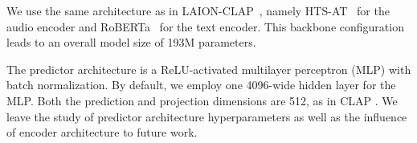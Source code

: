 \documentclass{article}
\begin{document}
We use the same architecture as in LAION-CLAP~\cite{wu2023large}, namely HTS-AT~\cite{chen2022hts} for the audio encoder and RoBERTa~\cite{liu2019roberta} for the text encoder.
This backbone configuration leads to an overall model size of 193M parameters.

The predictor architecture is a ReLU-activated multilayer perceptron (MLP) with batch normalization. By default, we employ one 4096-wide hidden layer for the MLP. Both the prediction and projection dimensions are 512, as in CLAP \cite{elizalde2023clap}. We leave the study of predictor architecture hyperparameters as well as the influence of encoder architecture to future work.


\end{document}
